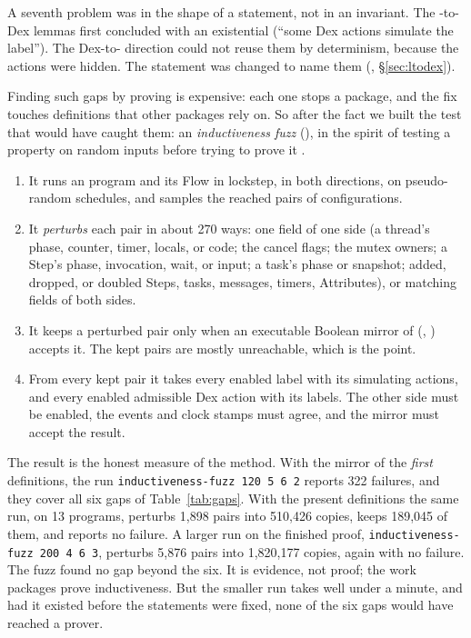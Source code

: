 A seventh problem was in the shape of a statement, not in an invariant. The
\Lang{}-to-Dex lemmas first concluded with an existential (``some Dex
actions simulate the label''). The Dex-to-\Lang{} direction could not reuse
them by determinism, because the actions were hidden. The statement was
changed to name them (,
\S\ref{sec:ltodex}).

Finding such gaps by proving is expensive: each one stops a package, and
the fix touches definitions that other packages rely on. So after the fact
we built the test that would have caught them: an \emph{inductiveness
fuzz} (), in the spirit of testing a
property on random inputs before trying to prove it
\cite{claessen2000quickcheck}.
\begin{enumerate}
\item It runs an \Lang{} program and its Flow in lockstep, in both
  directions, on pseudo-random schedules, and samples the reached pairs of
  configurations.
\item It \emph{perturbs} each pair in about 270 ways: one field of one side
  (a thread's phase, counter, timer, locals, or code; the cancel flags; the
  mutex owners; a Step's phase, invocation, wait, or input; a task's phase
  or snapshot; added, dropped, or doubled Steps, tasks, messages, timers,
  Attributes), or matching fields of both sides.
\item It keeps a perturbed pair only when an executable Boolean mirror of
   (,
  ) accepts it. The kept pairs are
  mostly unreachable, which is the point.
\item From every kept pair it takes every enabled \Lang{} label with its
  simulating actions, and every enabled admissible Dex action with its
  \Lang{} labels. The other side must be enabled, the events and clock
  stamps must agree, and the mirror must accept the result.
\end{enumerate}

The result is the honest measure of the method. With the mirror of the
\emph{first} definitions, the run \texttt{inductiveness-fuzz 120 5 6 2}
reports 322 failures, and they cover all six gaps of
Table~\ref{tab:gaps}. With the present definitions the same run, on 13
programs, perturbs 1,898 pairs into 510,426 copies, keeps 189,045 of them,
and reports no failure. A larger run on the finished proof,
\texttt{inductiveness-fuzz 200 4 6 3}, perturbs 5,876 pairs into 1,820,177
copies, again with no failure. The fuzz found no gap beyond the six. It is
evidence, not proof; the work packages prove inductiveness. But the
smaller run takes well under a minute, and had it existed before the statements were fixed,
none of the six gaps would have reached a prover.

